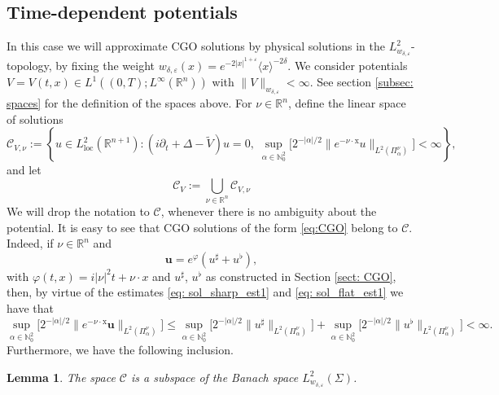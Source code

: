 \documentclass[10pt,a4paper]{amsart}
\newtheorem{lemma}[proposition]{Lemma}
\theoremstyle{remark}
\theoremstyle{definition}
\newcommand{\R}{\mathbb{R}}
\newcommand{\N}{\mathbb{N}}
\newcommand{\x}{\mathrm{x}}
\def\ve{\varepsilon}
\def\cal{\mathcal}
\def\wt{\widetilde}
\begin{document}
\subsection{Time-dependent potentials}\label{subsec: approx_tdpotential}
In this case we will approximate CGO solutions by physical solutions in the $L^2_{w_{\delta, \ve}}$-topology, by fixing the weight $w_{\delta, \ve}(x) = e^{-2|x|^{1+\ve}}\langle x \rangle^{-2\delta}$. We consider potentials $V=V(t, x) \in L^1((0, T); L^\infty(\R^n))$ with $\|V\|_{w_{\delta, \ve}} < \infty$. See section \ref{subsec: spaces} for the definition of the spaces above.
%
For $\nu\in \R^n$, define the linear space of solutions
%
\[
\mathcal C_{V, \nu} := \left\{u\in L^2_{\textrm{loc}}(\R^{n+1}):(i\partial_t+\Delta- \wt{V})u=0,\; \sup_{\alpha \in \N_0^2} \big[ 2^{-|\alpha|/2} \| e^{- \nu \cdot \x} u \|_{L^2(\Pi_\alpha^\nu)} \big] <\infty\right\}, 
\]
%
and let
%
\begin{equation}\label{eq: space_exponential}
\mathcal C_V := \bigcup_{\nu\in\R^n}\mathcal C_{V, \nu}
\end{equation}
%
We will drop the notation to $\cal C$, whenever there is no ambiguity about the potential.
It is easy to see that CGO solutions of the form \eqref{eq:CGO} belong to $\mathcal C$. Indeed, if $\nu\in\R^n$ and 
%
\[
	\mathbf{u}=e^\varphi(u^\sharp+u^\flat),
\]
%
with $\varphi(t,x)=i|\nu|^2t+\nu\cdot x$ and $u^\sharp$, $u^\flat$ as constructed in Section \ref{sect: CGO}, then, by virtue of the estimates \eqref{eq: sol_sharp_est1} and \eqref{eq: sol_flat_est1} we have that
%
\[
\sup_{\alpha \in \N_0^2} \big[ 2^{-|\alpha|/2} \| e^{- \nu \cdot \x} \mathbf{u} \|_{L^2(\Pi_\alpha^\nu)}\big]\leq\sup_{\alpha \in \N_0^2} \big[ 2^{-|\alpha|/2} \| u^\sharp \|_{L^2(\Pi_\alpha^\nu)}\big] + \sup_{\alpha \in \N_0^2} \big[ 2^{-|\alpha|/2} \| u^\flat \|_{L^2(\Pi_\alpha^\nu)}\big]<\infty.
\]
%
Furthermore, we have the following inclusion.
%
\begin{lemma}\label{lem: C_subspace_H}
	The space $\mathcal C$
	 is a subspace of the Banach space $L^2_{w_{\delta, \ve}}(\Sigma)$.
\end{lemma}
%
\end{document}
